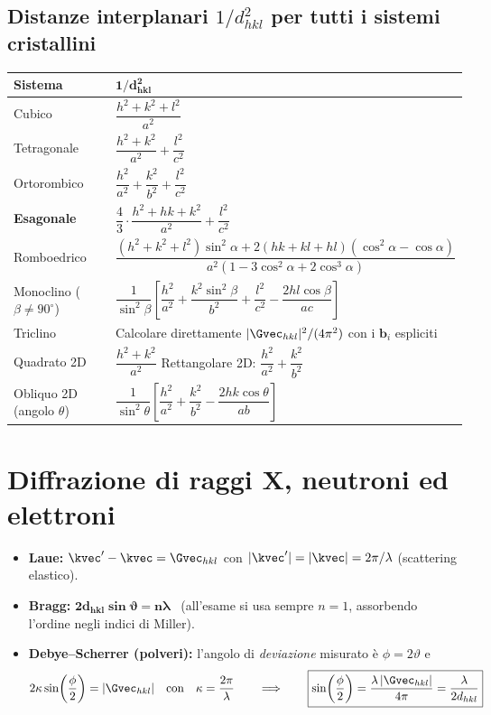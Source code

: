 \subsection{Distanze interplanari $1/d^2_{hkl}$ per tutti i sistemi cristallini}
\begin{center}
\renewcommand{\arraystretch}{1.9}
\begin{tabular}{l l}
\toprule
\textbf{Sistema} & $\bm{1/d^2_{hkl}}$ \\
\midrule
Cubico & $\dfrac{h^2+k^2+l^2}{a^2}$ \\
Tetragonale & $\dfrac{h^2+k^2}{a^2} + \dfrac{l^2}{c^2}$ \\
Ortorombico & $\dfrac{h^2}{a^2} + \dfrac{k^2}{b^2} + \dfrac{l^2}{c^2}$ \\
\textbf{Esagonale} & $\dfrac{4}{3}\cdot\dfrac{h^2+hk+k^2}{a^2} + \dfrac{l^2}{c^2}$ \\
Romboedrico & $\dfrac{(h^2+k^2+l^2)\sin^2\!\alpha + 2(hk+kl+hl)(\cos^2\!\alpha-\cos\alpha)}{a^2\left(1-3\cos^2\!\alpha+2\cos^3\!\alpha\right)}$ \\
Monoclino ($\beta\neq90^\circ$) & $\dfrac{1}{\sin^2\!\beta}\left[\dfrac{h^2}{a^2} + \dfrac{k^2\sin^2\!\beta}{b^2} + \dfrac{l^2}{c^2} - \dfrac{2hl\cos\beta}{ac}\right]$ \\
Triclino & Calcolare direttamente $|\Gvec_{hkl}|^2/(4\pi^2)$ con i $\mathbf{b}_i$ espliciti \\[2pt]
Quadrato 2D & $\dfrac{h^2+k^2}{a^2}$ \qquad Rettangolare 2D: $\dfrac{h^2}{a^2}+\dfrac{k^2}{b^2}$ \\
Obliquo 2D (angolo $\theta$) & $\dfrac{1}{\sin^2\!\theta}\left[\dfrac{h^2}{a^2}+\dfrac{k^2}{b^2}-\dfrac{2hk\cos\theta}{ab}\right]$ \\
\bottomrule
\end{tabular}
\end{center}




\section{Diffrazione di raggi X, neutroni ed elettroni}


\begin{itemize}
  \item \textbf{Laue:} $\kvec' - \kvec = \Gvec_{hkl}$ con $|\kvec'|=|\kvec|=2\pi/\lambda$ (scattering elastico).
  \item \textbf{Bragg:} $\bm{2 d_{hkl} \sin\vartheta = n\lambda}$ \ (all'esame si usa sempre $n=1$, assorbendo l'ordine negli indici di Miller).
  \item \textbf{Debye--Scherrer (polveri):} l'angolo di \emph{deviazione} misurato è $\phi = 2\vartheta$ e
  \[ 2\kappa \sin\!\left(\frac{\phi}{2}\right) = |\Gvec_{hkl}| \quad\text{con}\quad \kappa=\frac{2\pi}{\lambda}
     \qquad\Longrightarrow\qquad
     \boxed{\sin\!\left(\frac{\phi}{2}\right) = \frac{\lambda\,|\Gvec_{hkl}|}{4\pi} = \frac{\lambda}{2 d_{hkl}}} \]
\end{itemize}

